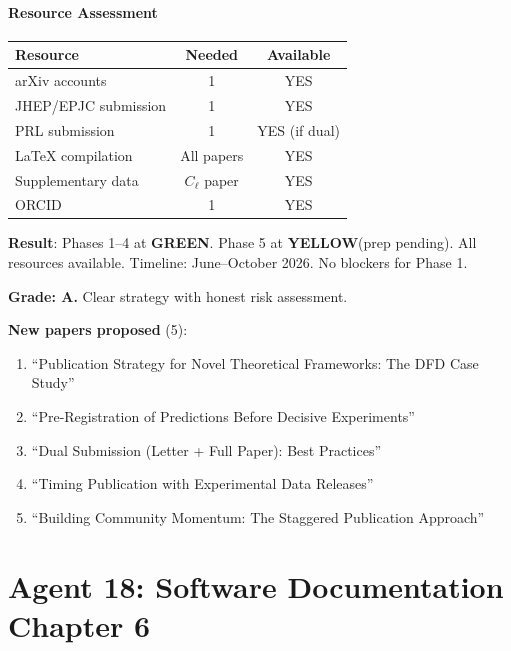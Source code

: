 \documentclass[11pt,a4paper]{article}
\newcommand{\GREEN}{\textcolor{dfdgreen}{\textbf{GREEN}}}
\newcommand{\YELLOW}{\textcolor{dfdyellow}{\textbf{YELLOW}}}
\begin{document}
\subsection{Resource Assessment}

\begin{center}
\begin{tabular}{lcc}
\toprule
\textbf{Resource} & \textbf{Needed} & \textbf{Available} \\
\midrule
arXiv accounts & 1 & YES \\
JHEP/EPJC submission & 1 & YES \\
PRL submission & 1 & YES (if dual) \\
LaTeX compilation & All papers & YES \\
Supplementary data & $C_\ell$ paper & YES \\
ORCID & 1 & YES \\
\bottomrule
\end{tabular}
\end{center}

\begin{tcolorbox}[colback=green!5!white, colframe=green!60!black, title={Agent 17: Launch Readiness COMPLETE}]
\textbf{Result}: Phases 1--4 at \GREEN. Phase 5 at \YELLOW (prep pending). All resources available. Timeline: June--October 2026. No blockers for Phase 1.

\textbf{Grade: A.} Clear strategy with honest risk assessment.

\textbf{New papers proposed} (5):
\begin{enumerate}
\item ``Publication Strategy for Novel Theoretical Frameworks: The DFD Case Study''
\item ``Pre-Registration of Predictions Before Decisive Experiments''
\item ``Dual Submission (Letter + Full Paper): Best Practices''
\item ``Timing Publication with Experimental Data Releases''
\item ``Building Community Momentum: The Staggered Publication Approach''
\end{enumerate}
\end{tcolorbox}


\part{Agent 18: Software Documentation Chapter 6}
\label{part:software-ch6}
\end{document}
